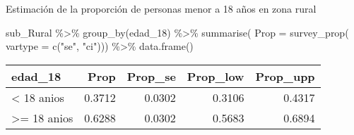 \documentclass[
  ignorenonframetext,
]{beamer}
\newenvironment{Shaded}{\begin{snugshade}}{\end{snugshade}}
\newcommand{\AttributeTok}[1]{\textcolor[rgb]{0.77,0.63,0.00}{#1}}
\newcommand{\FunctionTok}[1]{\textcolor[rgb]{0.00,0.00,0.00}{#1}}
\newcommand{\NormalTok}[1]{#1}
\newcommand{\SpecialCharTok}[1]{\textcolor[rgb]{0.00,0.00,0.00}{#1}}
\newcommand{\StringTok}[1]{\textcolor[rgb]{0.31,0.60,0.02}{#1}}
\begin{document}
\begin{frame}[fragile]{Estimación de la proporción de personas menor a
18 años en zona rural}
\protect\hypertarget{estimaciuxf3n-de-la-proporciuxf3n-de-personas-menor-a-18-auxf1os-en-zona-rural}{}
\begin{Shaded}
\begin{Highlighting}[]
\NormalTok{sub\_Rural }\SpecialCharTok{\%\textgreater{}\%}
  \FunctionTok{group\_by}\NormalTok{(edad\_18) }\SpecialCharTok{\%\textgreater{}\%} 
  \FunctionTok{summarise}\NormalTok{(}
    \AttributeTok{Prop =} \FunctionTok{survey\_prop}\NormalTok{(}
      \AttributeTok{vartype =}  \FunctionTok{c}\NormalTok{(}\StringTok{"se"}\NormalTok{, }\StringTok{"ci"}\NormalTok{))) }\SpecialCharTok{\%\textgreater{}\%}
  \FunctionTok{data.frame}\NormalTok{()}
\end{Highlighting}
\end{Shaded}

\begin{longtable}[]{@{}lrrrr@{}}
\toprule
edad\_18 & Prop & Prop\_se & Prop\_low & Prop\_upp \\
\midrule
\endhead
\textless{} 18 anios & 0.3712 & 0.0302 & 0.3106 & 0.4317 \\
\textgreater= 18 anios & 0.6288 & 0.0302 & 0.5683 & 0.6894 \\
\bottomrule
\end{longtable}
\end{frame}
\end{document}

